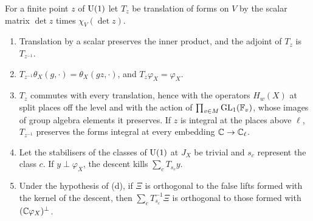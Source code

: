 \begin{lemma}\label{lem:central-action}
For a finite point $z$ of $\operatorname{U}(1)$ let $T_z$ be translation of forms on $V$ by the scalar matrix $\det z$ times $\chi_V(\det z)$.
\begin{enumerate}[label=\textup{(\alph*)}]
\item Translation by a scalar preserves the inner product, and the adjoint of $T_z$ is $T_{z^{-1}}$.
\item $T_{z^{-1}}\theta_X(g,\cdot)=\theta_X(gz,\cdot)$, and $T_z\varphi_X=\varphi_X$.
\item $T_z$ commutes with every translation, hence with the operators $H_w(X)$ at split places off the level and with the action of $\prod_{v\in M}\operatorname{GL}_1(\mathbb{F}_v)$, whose images of group algebra elements it preserves. If $z$
is integral at the places above $\ell$, $T_{z^{-1}}$ preserves the forms integral at every embedding $\mathbb{C}\to\mathbb{C}_\ell$.
\item Let the stabilisers of the classes of $\operatorname{U}(1)$ at $J_X$ be trivial and $s_c$ represent the class $c$. If $y\perp\varphi_X$, the descent kills $\sum_cT_{s_c}y$.
\item Under the hypothesis of (d), if $\Xi$ is orthogonal to the false lifts formed with the kernel of the descent, then $\sum_cT_{s_c}^{-1}\Xi$ is orthogonal to those formed with $(\mathbb{C}\varphi_X)^\perp$.
\end{enumerate}
\end{lemma}

